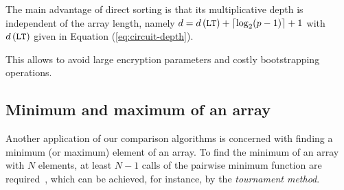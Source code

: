 	The main advantage of direct sorting is that its multiplicative depth is independent of the array length, namely $d = d\left(\mathtt{LT}\right) + \left\lceil \log_2 (p-1) \right\rceil + 1$ with $d\left(\mathtt{LT}\right)$ given in Equation (\ref{eq:circuit-depth}).
        
	This allows to avoid large encryption parameters and costly bootstrapping operations.

\subsection{Minimum and maximum of an array}
\label{sec:min/max}

	Another application of our comparison algorithms is concerned with finding a minimum (or maximum) element of an array.
	To find the minimum of an array with $N$ elements, at least $N-1$ calls of the pairwise minimum function are required~\cite[Chapter 9]{CLR09}, which can be achieved, for instance, by the \emph{tournament method}.
	
